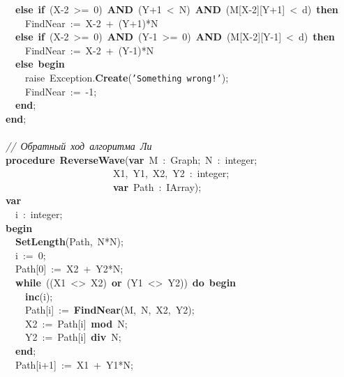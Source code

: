 \mbox{}\ \ \textbf{else}\ \textbf{if}\ (X-2\ \textgreater{}=\ 0)\ \textbf{AND}\ (Y+1\ \textless{}\ N)\ \textbf{AND}\ (M[X-2][Y+1]\ \textless{}\ d)\ \textbf{then} \\
\mbox{}\ \ \ \ FindNear\ :=\ X-2\ +\ (Y+1)*N \\
\mbox{}\ \ \textbf{else}\ \textbf{if}\ (X-2\ \textgreater{}=\ 0)\ \textbf{AND}\ (Y-1\ \textgreater{}=\ 0)\ \textbf{AND}\ (M[X-2][Y-1]\ \textless{}\ d)\ \textbf{then} \\
\mbox{}\ \ \ \ FindNear\ :=\ X-2\ +\ (Y-1)*N \\
\mbox{}\ \ \textbf{else}\ \textbf{begin} \\
\mbox{}\ \ \ \ raise\ Exception.\textbf{Create}(\texttt{'Something\ wrong!'}); \\
\mbox{}\ \ \ \ FindNear\ :=\ -1; \\
\mbox{}\ \ \textbf{end}; \\
\mbox{}\textbf{end}; \\
\mbox{} \\
\mbox{}\textit{//\ Обратный\ ход\ алгоритма\ Ли} \\
\mbox{}\textbf{procedure}\ \textbf{ReverseWave}(\textbf{var}\ M\ :\ Graph;\ N\ :\ integer; \\
\mbox{}\ \ \ \ \ \ \ \ \ \ \ \ \ \ \ \ \ \ \ \ \ \ X1,\ Y1,\ X2,\ Y2\ :\ integer; \\
\mbox{}\ \ \ \ \ \ \ \ \ \ \ \ \ \ \ \ \ \ \ \ \ \ \textbf{var}\ Path\ :\ IArray); \\
\mbox{}\textbf{var} \\
\mbox{}\ \ i\ :\ integer; \\
\mbox{}\textbf{begin} \\
\mbox{}\ \ \textbf{SetLength}(Path,\ N*N); \\
\mbox{}\ \ i\ :=\ 0; \\
\mbox{}\ \ Path[0]\ :=\ X2\ +\ Y2*N; \\
\mbox{}\ \ \textbf{while}\ ((X1\ \textless{}\textgreater{}\ X2)\ \textbf{or}\ (Y1\ \textless{}\textgreater{}\ Y2))\ \textbf{do}\ \textbf{begin} \\
\mbox{}\ \ \ \ \textbf{inc}(i); \\
\mbox{}\ \ \ \ Path[i]\ :=\ \textbf{FindNear}(M,\ N,\ X2,\ Y2); \\
\mbox{}\ \ \ \ X2\ :=\ Path[i]\ \textbf{mod}\ N; \\
\mbox{}\ \ \ \ Y2\ :=\ Path[i]\ \textbf{div}\ N; \\
\mbox{}\ \ \textbf{end}; \\
\mbox{}\ \ Path[i+1]\ :=\ X1\ +\ Y1*N; \\
